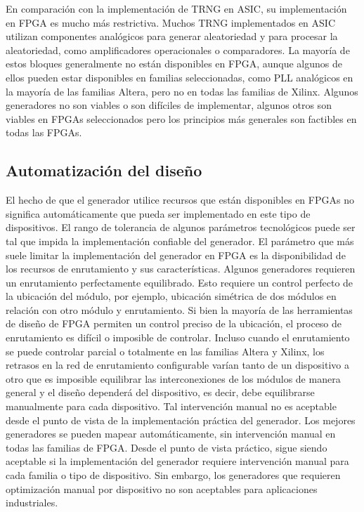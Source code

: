 	En comparación con la implementación de TRNG en ASIC, su implementación en FPGA es mucho más restrictiva. Muchos TRNG implementados en ASIC utilizan componentes analógicos para generar aleatoriedad y para procesar la aleatoriedad, como amplificadores operacionales o comparadores. La mayoría de estos bloques generalmente no están disponibles en FPGA, aunque algunos de ellos pueden estar disponibles en familias seleccionadas, como PLL analógicos en la mayoría de las familias Altera, pero no en todas las familias de Xilinx. Algunos generadores no son viables o son difíciles de implementar, algunos otros son viables en FPGAs seleccionados pero los principios más generales son factibles en todas las FPGAs.
				
	\subsection{Automatización del diseño}
				
	El hecho de que el generador utilice recursos que están disponibles en FPGAs no significa automáticamente que pueda ser implementado en este tipo de dispositivos. El rango de tolerancia de algunos parámetros tecnológicos puede ser tal que impida la implementación confiable del generador. El parámetro que más suele limitar la implementación del generador en FPGA es la disponibilidad de los recursos de enrutamiento y sus características. Algunos generadores requieren un enrutamiento perfectamente equilibrado. Esto requiere un control perfecto de la ubicación del módulo, por ejemplo, ubicación simétrica de dos módulos en relación con otro módulo y enrutamiento. Si bien la mayoría de las herramientas de diseño de FPGA permiten un control preciso de la ubicación, el proceso de enrutamiento es difícil o imposible de controlar. Incluso cuando el enrutamiento se puede controlar parcial o totalmente en las familias Altera y Xilinx, los retrasos en la red de enrutamiento configurable varían tanto de un dispositivo a otro que es imposible equilibrar las interconexiones de los módulos de manera general y el diseño dependerá del dispositivo, es decir, debe equilibrarse manualmente para cada dispositivo. Tal intervención manual no es aceptable desde el punto de vista de la implementación práctica del generador. Los mejores generadores se pueden mapear automáticamente, sin intervención manual en todas las familias de FPGA. Desde el punto de vista práctico, sigue siendo aceptable si la implementación del generador requiere intervención manual para cada familia o tipo de dispositivo. Sin embargo, los generadores que requieren optimización manual por dispositivo no son aceptables para aplicaciones industriales.
	
